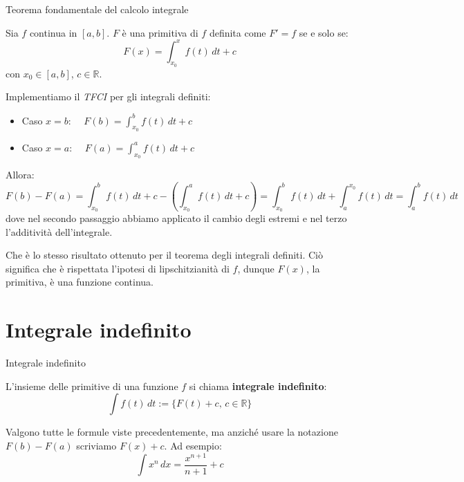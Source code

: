 \documentclass[12pt]{report}
\begin{document}
	\begin{teorema}{Teorema fondamentale del calcolo integrale}{}
		
		Sia $f$ continua in $[a, b]$. $F$ è una primitiva di $f$ definita come $F' = f$ se e solo se:
		\[
		F(x) = \int_{x_0}^{x} f(t) \, dt + c
		\]
		con $x_0 \in [a, b]$, $c \in \mathbb{R}$.
		
	\end{teorema}
	
	Implementiamo il \textit{TFCI} per gli integrali definiti:
	\begin{itemize}
		
		\item Caso $x = b$: $\quad F(b) = \int_{x_0}^{b} f(t) \, dt + c$
		
		\item Caso $x = a$: $\quad F(a) = \int_{x_0}^{a} f(t) \, dt + c$
		
	\end{itemize}
	
	Allora:
	\[
	F(b) - F(a) = \int_{x_0}^{b} f(t) \, dt + c - \left(\int_{x_0}^{a} f(t) \, dt + c\right) = \int_{x_0}^{b} f(t) \, dt + \int_{a}^{x_0} f(t) \, dt = \int_{a}^{b} f(t) \, dt
	\]
	dove nel secondo passaggio abbiamo applicato il cambio degli estremi e nel terzo l'additività dell'integrale.
	
	Che è lo stesso risultato ottenuto per il teorema degli integrali definiti.
	Ciò significa che è rispettata l'ipotesi di lipschitzianità di $f$, dunque $F(x)$, la primitiva, è una funzione continua.
	
	\section{Integrale indefinito}
	
	\begin{definizione}{Integrale indefinito}{}
		
		L'insieme delle primitive di una funzione $f$ si chiama \textbf{integrale indefinito}:
		\[
		\int f(t) \, dt := \{F(t) + c, \, c \in \mathbb{R}\}
		\]
		
	\end{definizione}
	
	Valgono tutte le formule viste precedentemente, ma anziché usare la notazione $F(b) - F(a)$ scriviamo $F(x) + c$. Ad esempio:
	\[
	\int x^n \, dx = \frac{x^{n+1}}{n+1} + c
	\]
	
\end{document}
